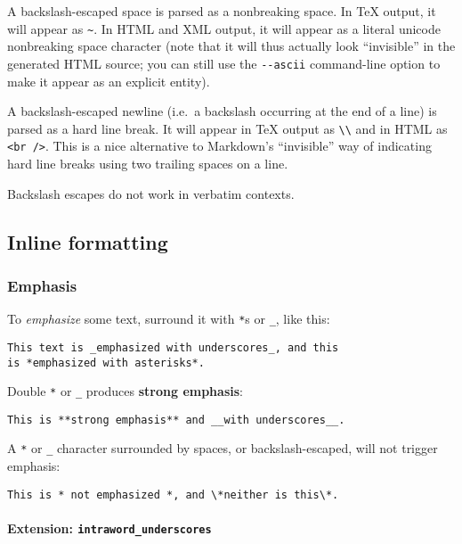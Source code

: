 \documentclass[
]{article}
\begin{document}
A backslash-escaped space is parsed as a nonbreaking space. In TeX
output, it will appear as \texttt{\textasciitilde{}}. In HTML and XML
output, it will appear as a literal unicode nonbreaking space character
(note that it will thus actually look ``invisible'' in the generated
HTML source; you can still use the \texttt{-\/-ascii} command-line
option to make it appear as an explicit entity).

A backslash-escaped newline (i.e.~a backslash occurring at the end of a
line) is parsed as a hard line break. It will appear in TeX output as
\texttt{\textbackslash{}\textbackslash{}} and in HTML as
\texttt{\textless{}br\ /\textgreater{}}. This is a nice alternative to
Markdown's ``invisible'' way of indicating hard line breaks using two
trailing spaces on a line.

Backslash escapes do not work in verbatim contexts.

\hypertarget{inline-formatting}{%
\subsection{Inline formatting}\label{inline-formatting}}

\hypertarget{emphasis}{%
\subsubsection{Emphasis}\label{emphasis}}

To \emph{emphasize} some text, surround it with \texttt{*}s or
\texttt{\_}, like this:

\begin{verbatim}
This text is _emphasized with underscores_, and this
is *emphasized with asterisks*.
\end{verbatim}

Double \texttt{*} or \texttt{\_} produces \textbf{strong emphasis}:

\begin{verbatim}
This is **strong emphasis** and __with underscores__.
\end{verbatim}

A \texttt{*} or \texttt{\_} character surrounded by spaces, or
backslash-escaped, will not trigger emphasis:

\begin{verbatim}
This is * not emphasized *, and \*neither is this\*.
\end{verbatim}

\hypertarget{extension-intraword_underscores}{%
\paragraph{\texorpdfstring{Extension:
\texttt{intraword\_underscores}}{Extension: intraword\_underscores}}\label{extension-intraword_underscores}}
\end{document}
